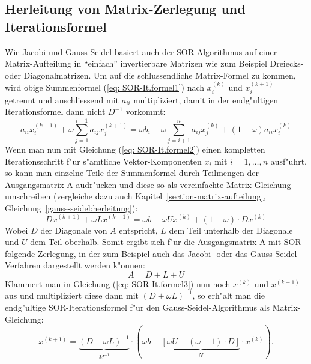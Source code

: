 \begin{refsection}
\subsection{Herleitung von Matrix-Zerlegung und Iterationsformel \label{subsec: SOR-Herleitung}}
Wie Jacobi und Gauss-Seidel basiert auch der SOR-Algorithmus auf einer
Matrix-Aufteilung in ``einfach'' invertierbare Matrizen wie zum Beispiel
Dreiecks- oder Diagonalmatrizen. Um auf die schlussendliche Matrix-Formel
zu kommen,
wird obige Summenformel (\ref{eq: SOR-It.formel1}) nach $x_i^{(k)}$
und $x_i^{(k+1)}$
getrennt und anschliessend mit $a_{ii}$ multipliziert, damit in der
endg"ultigen Iterationsformel dann nicht $D^{-1}$ vorkommt:
\begin{equation} \label{eq: SOR-It.formel2}
	a_{ii}x_i^{(k+1)} %
	+\omega %
	\sum\limits_{j=1}^{i-1} a_{ij}x_j^{(k+1)} %
 = \omega b_i- \omega %
 \sum\limits_{j=i+1}^n a_{ij}x_j^{(k)} %
 +(1-\omega)	%
	a_{ii}x_i^{(k)} %
\end{equation}
Wenn man nun mit Gleichung (\ref{eq: SOR-It.formel2}) einen kompletten
Iterationsschritt f"ur s"amtliche Vektor-Kompo\-nenten $x_i$ mit
$i=1,\dots,n$ ausf"uhrt, so kann man einzelne Teile der Summenformel
durch Teilmengen der Ausgangsmatrix A audr"ucken und diese so als
vereinfachte Matrix-Gleichung \cite{wikiEn_SOR} umschreiben (vergleiche
dazu auch
Kapitel~\ref{section-matrix-aufteilung},
Gleichung~\ref{gauss-seidel:herleitung}):
\begin{equation} \label{eq: SOR-It.formel3}
Dx^{(k+1)}+\omega Lx^{(k+1)}=\omega b-\omega Ux^{(k)}+(1-\omega)\cdot Dx^{(k)}
\end{equation}
Wobei $D$ der Diagonale von $A$ entspricht, $L$ dem Teil unterhalb
der Diagonale und $U$ dem Teil oberhalb. Somit ergibt sich f"ur die
Ausgangsmatrix A mit SOR folgende Zerlegung, in der zum Beispiel auch
das Jacobi- oder das Gauss-Seidel-Verfahren dargestellt werden k"onnen:
\begin{equation} \label{eq: SOR Matrix-Splitting}
A=D+L+U
\end{equation}
Klammert man in Gleichung (\ref{eq: SOR-It.formel3}) nun noch $x^{(k)}$
und $x^{(k+1)}$ aus und multipliziert diese dann mit $(D+\omega
L)^{-1}$, so erh"alt man die endg"ultige SOR-Iterationsformel f"ur den
Gauss-Seidel-Algorithmus als Matrix-Gleichung:
\begin{equation} \label{eq: SOR-It.formel}
x^{(k+1)}=\underbrace{(D+\omega L)^{-1}}_{\substack{M^{-1}}}\cdot(\omega b-\underbrace{[\omega U+(\omega-1)\cdot D]}_{\substack{N}}\cdot x^{(k)}).
\end{equation}



\end{refsection}
